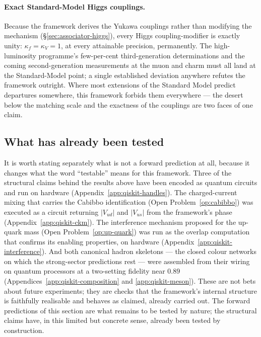  \paragraph{Exact Standard-Model Higgs couplings.}
 Because the framework derives the Yukawa couplings rather than modifying
 the mechanism (\S\ref{sec:associator-higgs}), every Higgs
 coupling-modifier is exactly unity: $\kappa_f = \kappa_V = 1$, at every
 attainable precision, permanently. The high-luminosity programme's
 few-per-cent third-generation determinations and the coming
 second-generation measurements at the muon and charm
 \autocite{cepeda2019hllhc} must all land at the Standard-Model point; a
 single established deviation anywhere refutes the framework outright.
 Where most extensions of the Standard Model predict departures somewhere,
 this framework forbids them everywhere --- the desert below the matching
 scale and the exactness of the couplings are two faces of one claim.

\subsection{What has already been tested}

It is worth stating separately what is not a forward prediction at all, because it changes what the
word ``testable'' means for this framework. Three of the structural claims behind the results above
have been encoded as quantum circuits and run on hardware
(Appendix~\ref{app:qiskit-handles}). The charged-current mixing that carries the Cabibbo
identification (Open Problem~\ref{op:cabibbo}) was executed as a circuit returning
$\lvert V_{ud}\rvert$ and $\lvert V_{us}\rvert$ from the framework's phase
(Appendix~\ref{app:qiskit-ckm}). The interference mechanism proposed for the up-quark mass
(Open Problem~\ref{op:up-quark}) was run as the overlap computation that confirms its enabling
properties, on hardware (Appendix~\ref{app:qiskit-interference}). And both canonical hadron
skeletons --- the closed colour networks on which the strong-sector predictions rest --- were
assembled from their wiring on quantum processors at a two-setting fidelity near $0.89$
(Appendices~\ref{app:qiskit-composition} and \ref{app:qiskit-meson}). These are not bets about future
experiments; they are checks that the framework's internal structure is faithfully realisable and
behaves as claimed, already carried out. The forward predictions of this section are what remains to
be tested by nature; the structural claims have, in this limited but concrete sense, already been
tested by construction.

